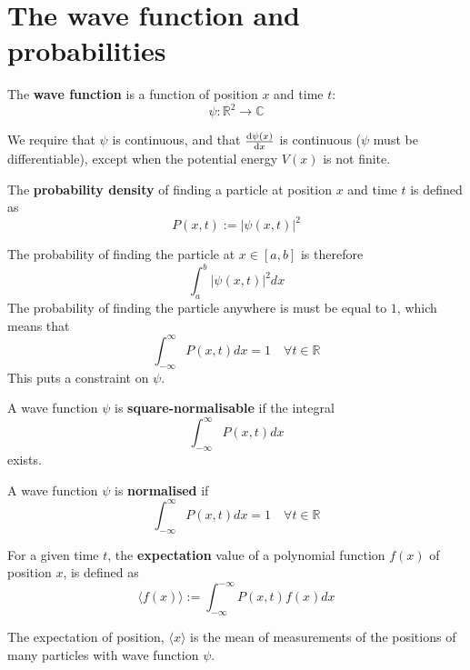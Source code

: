 \section{The wave function and probabilities}

\begin{definition}
	The \textbf{wave function} is a function of position $x$ and time $t$:
	\[
		\psi: \mathbb{R}^2 \rightarrow \mathbb{C}
	\]
\end{definition}

\begin{remark}
	We require that $\psi$ is continuous, and that $\diff{\psi(x)}{x}$ is continuous ($\psi$ must be differentiable), except when the potential energy $V(x)$ is not finite. 
\end{remark}

\begin{definition}
	The \textbf{probability density} of finding a particle at position $x$ and time $t$ is defined as
	\[
		P(x, t) := |\psi(x, t)|^2
	\]

	The probability of finding the particle at $x \in [a, b]$ is therefore
	\[
		\int_a^b |\psi(x, t)|^2 dx
	\]
	The probability of finding the particle anywhere is must be equal to $1$, which means that
	\[
		\int_{-\infty}^{\infty} P(x, t) dx = 1 \quad \forall t \in \mathbb{R}
	\]
	This puts a constraint on $\psi$.
\end{definition}

\begin{definition}
	A wave function $\psi$ is \textbf{square-normalisable} if the integral
	\[
		\int_{-\infty}^{\infty} P(x, t) dx
	\]
	exists.
\end{definition}

\begin{definition}
	A wave function $\psi$ is \textbf{normalised} if
	\[
		\int_{-\infty}^{\infty} P(x, t) dx = 1 \quad \forall t \in \mathbb{R}	
	\]
\end{definition}

\begin{definition}
	For a given time $t$, the \textbf{expectation} value of a polynomial function $f(x)$ of position $x$, is defined as
	\[
		\langle f(x) \rangle := \int_{-\infty}^{-\infty} P(x, t) f(x) dx
	\]
\end{definition}

\begin{remark}
	The expectation of position, $\langle x \rangle$ is the mean of measurements of the positions of many particles with wave function $\psi$.
\end{remark}

